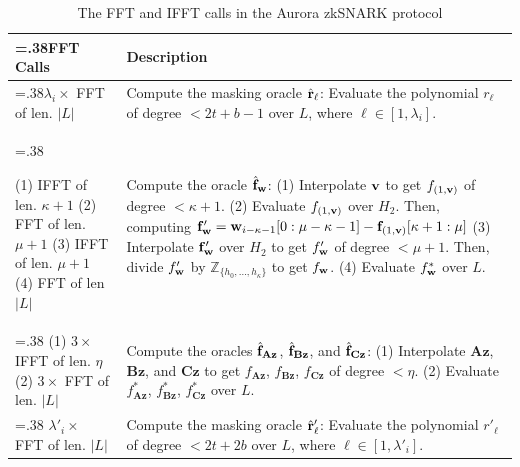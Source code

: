 \begin{table}
	\centering
	\caption{ The FFT and IFFT calls in the Aurora zkSNARK protocol}
	{
		\label{tab:fftcalls}
		\begin{tabularx}{\linewidth}{>{\hsize=.38\hsize}XX}
			\toprule
			\textbf{FFT Calls} & \textbf{Description} \\
			\midrule
			$\lambda_i \times$ FFT of len. $|L|$ & Compute the masking oracle $\hat{{\bf{r}}}_\ell$: Evaluate the polynomial $r_\ell$ of degree $<2t+b-1$ over $L$, where $\ell \in [1,\lambda_i]$. \\
			\midrule
			
			(1) IFFT of len. $\kappa + 1$\newline
			(2) FFT of len. $\mu + 1$\newline
			(3) IFFT of len. $\mu + 1$\newline
			(4) FFT of len $|L|$
			& Compute the oracle $\hat{{\bf{f}}}_{\bf{w}}$: \newline
			(1) Interpolate ${\bf{v}}$ to get $f_{(1,{\bf{v}})}$ of degree $<\kappa + 1$. \newline
			(2) Evaluate $f_{(1,{\bf{v}})}$ over $H_2$. \newline 
			Then, computing ${\bf{f}}'_{\bf{w}} = {{\bf{w}}_{i-\kappa-1}[0:\mu-\kappa - 1] - {\bf{f}}_{(1,{\bf{v}})}[\kappa+1:\mu]}$ \newline
			(3) Interpolate ${\bf{f}}'_{\bf{w}}$ over $H_2$ to get $f'_{\bf{w}}$ of degree $< \mu + 1$. \newline
			Then, divide $f'_{\bf{w}}$ by $\mathbb{Z}_{\{h_0,\dots, h_{\kappa}\}}$ to get $f_{\bf{w}}$.\newline
			(4) Evaluate $f_{\bf{w}}^*$ over $L$.
			\\
			\midrule
			(1) $3 \times$ IFFT of len. $\eta$\newline
			(2) $3 \times$ FFT of len. $|L|$
			&
			Compute the oracles $\hat{{\bf{f}}}_{\mathbf{Az}}$, $\hat{{\bf{f}}}_{\mathbf{Bz}}$, and $\hat{{\bf{f}}}_{\mathbf{Cz}}$:\newline
			(1) Interpolate $\mathbf{Az}$, $\mathbf{Bz}$, and $\mathbf{Cz}$ to get $f_\mathbf{Az}$, $f_\mathbf{Bz}$, $f_\mathbf{Cz}$ of degree $<\eta$.\newline
			(2) Evaluate $f_\mathbf{Az}^*$, $f_\mathbf{Bz}^*$, $f_\mathbf{Cz}^*$ over $L$.
			\\
			\midrule
			$\lambda'_i \times$ FFT of len. $|L|$ & Compute the masking oracle $\hat{{\bf{r}}}'_\ell$: Evaluate the polynomial $r'_\ell$ of degree $<2t+2b$ over $L$, where $\ell \in [1,\lambda'_i]$. \\

\end{tabularx}}
\end{table}
